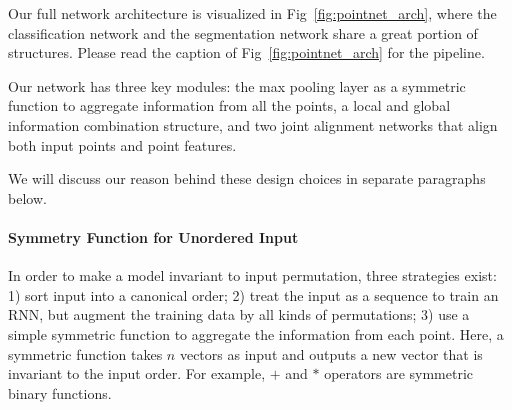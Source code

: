 Our full network architecture is visualized in Fig~\ref{fig:pointnet_arch}, where the classification network and the segmentation network share a great portion of structures. Please read the caption of Fig~\ref{fig:pointnet_arch} for the pipeline.

Our network has three key modules: the max pooling layer as a symmetric function to aggregate information from all the points, a local and global information combination structure, and two joint alignment networks that align both input points and point features.

We will discuss our reason behind these design choices in separate paragraphs below. %

% 
% 
% 
% 

\paragraph{Symmetry Function for Unordered Input}
In order to make a model invariant to input permutation, three strategies exist: 1) sort input into a canonical order; 2) treat the input as a sequence to train an RNN, but augment the training data by all kinds of permutations; 3) use a simple symmetric function to aggregate the information from each point. Here, a symmetric function takes $n$ vectors as input and outputs a new vector that is invariant to the input order. For example, $+$ and $*$ operators are symmetric binary functions. 

